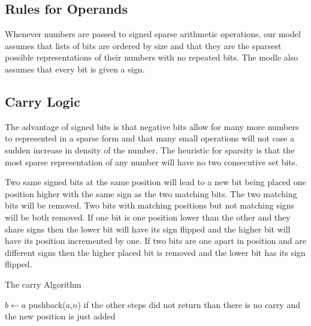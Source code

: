 \documentclass[letterpaper,11pt]{article}
\begin{document}
\subsection{Rules for Operands}
Whenever numbers are passed to signed sparse arithmetic operations, 
our model assumes that lists of bits are ordered by size and that they are the sparsest possible
representations of their numbers with no repeated bits. The modle also assumes that every bit is given a sign.


\subsection{Carry Logic} The advantage of signed bits is that negative
bits allow for many more numbers to represented in a sparse form and
that many small operations will not case a sudden increase in density of
the number.  The heuristic for sparsity is that the most sparse
representation of any number will have no two consecutive set bits.  

Two same signed bits at the same position will lead to a new bit being
placed one position higher with the same sign as the two matching bits.
The two matching bits will be removed. Two bits with matching positions
but not matching signs will be both removed.  If one bit is one position
lower than the other and they share signs then the lower bit will have
its sign flipped and the higher bit will have its position incremented
by one.  If two bits are one apart in position and are different signs
then the higher placed bit is removed and the lower bit has its sign
flipped.
\begin{algorithm}[Htbp]
  \caption{The carry Algorithm}
	$b \gets a$ \;
	pushback($a$,$n$)\; if the other steps did not return than there is no carry and the new position is just added

\end{algorithm}
\end{document}
